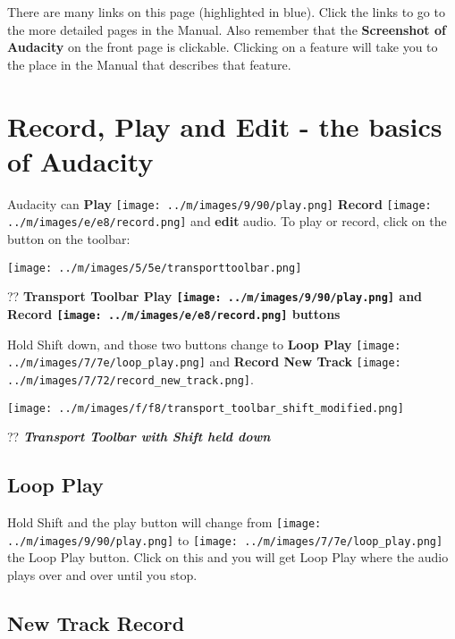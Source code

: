 \documentclass[twocolumn]{book}
\begin{document}
There are many links on this page (highlighted in blue). Click the links to go to the more detailed pages in the Manual. 
Also remember that the \textbf{Screenshot of Audacity} on the front page is clickable.  Clicking on a feature will take you to the place in the Manual that describes that feature. 



\section{Record, Play and Edit - the basics of Audacity}


Audacity can \textbf{Play} \texttt{[image: ../m/images/9/90/play.png]} \textbf{Record} \texttt{[image: ../m/images/e/e8/record.png]} and  \textbf{edit} audio.  To play or record, click on the button on the toolbar:\par\texttt{[image: ../m/images/5/5e/transporttoolbar.png]}\par??
\textbf{Transport Toolbar Play \texttt{[image: ../m/images/9/90/play.png]} and Record \texttt{[image: ../m/images/e/e8/record.png]} buttons}


Hold Shift down, and those two buttons change to \textbf{Loop Play} \texttt{[image: ../m/images/7/7e/loop\_play.png]} and \textbf{Record New Track} \texttt{[image: ../m/images/7/72/record\_new\_track.png]}.\par\texttt{[image: ../m/images/f/f8/transport\_toolbar\_shift\_modified.png]}\par??
\textit{\textbf{Transport Toolbar with Shift held down}}

\subsection{Loop Play}


Hold Shift and the play button will change from \texttt{[image: ../m/images/9/90/play.png]} to \texttt{[image: ../m/images/7/7e/loop\_play.png]} the Loop Play button. Click on this and you will get Loop Play where the audio plays over and over until you stop.  

\subsection{New Track Record}
\end{document}

